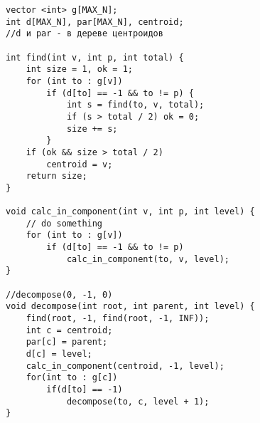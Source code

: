 \begin{verbatim}
vector <int> g[MAX_N];
int d[MAX_N], par[MAX_N], centroid; 
//d и par - в дереве центроидов

int find(int v, int p, int total) {
	int size = 1, ok = 1;
	for (int to : g[v]) 
		if (d[to] == -1 && to != p) {
			int s = find(to, v, total);
			if (s > total / 2) ok = 0;
			size += s;
		}
	if (ok && size > total / 2) 
		centroid = v;
	return size;
}

void calc_in_component(int v, int p, int level) {
	// do something
	for (int to : g[v])
		if (d[to] == -1 && to != p)
			calc_in_component(to, v, level);
}

//decompose(0, -1, 0)
void decompose(int root, int parent, int level) {  
	find(root, -1, find(root, -1, INF));
	int c = centroid;
	par[c] = parent;
	d[c] = level;
	calc_in_component(centroid, -1, level);
	for(int to : g[c])
		if(d[to] == -1)
			decompose(to, c, level + 1);
}
\end{verbatim}
